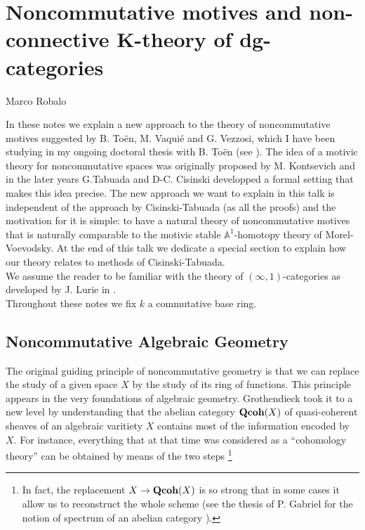 \chapter{Noncommutative motives and non-connective K-theory of dg-categories}
\begin{flushright}
  Marco Robalo
\end{flushright}

\begin{refsection}

In these notes we explain a new approach to the theory of noncommutative motives suggested by B. To\"en, M. Vaqui\'e and G. Vezzosi, which I have been studying in my ongoing doctoral thesis with B. To\"en (see \cite{nc1, nc2}). The idea of a motivic theory for noncommutative spaces was originally proposed by M. Kontsevich \cite{kontsevich1, kontsevich2} and in the later years G.Tabuada and D-C. Cisinski \cite{tabuada-higherktheory, tabuada-cisinski, MR2822869, MR2986869} developped a formal setting that makes this idea precise. The new approach we want to explain in this talk is independent of the approach by Cisinski-Tabuada (as all the proofs) and the motivation for it is simple: to have a natural theory of noncommutative motives that is naturally comparable to the motivic stable $\mathbb{A}^1$-homotopy theory of Morel-Voevodsky. At the end of this talk we dedicate a special section to explain how our theory relates to methods of Cisinski-Tabuada.\\

 We assume the reader to be familiar with the theory of $(\infty,1)$-categories as developed by J. Lurie in \cite{htt, ha}. \\
 
Throughout these notes we fix $k$ a commutative base ring.

\section{Noncommutative Algebraic Geometry}

The original guiding principle of noncommutative geometry is that we can replace the study of a given space $X$ by the study of its ring of functions. This principle appears in the very foundations of algebraic geometry. Grothendieck took it to a new level by understanding that the abelian category $\mathbf{Qcoh}(X)$ of quasi-coherent sheaves of an algebraic varitiety $X$ contains most of the information encoded by $X$.  For instance, everything that at that time was considered as a ``cohomology theory''  can be obtained by means of the two steps \footnote{ In fact, the replacement $X\to \mathbf{Qcoh}(X)$ is so strong that in some cases it allow us to reconstruct the whole scheme (see the thesis of P. Gabriel for the notion of spectrum of an abelian category \cite{gabrielthesis}).} 



\end{refsection}
